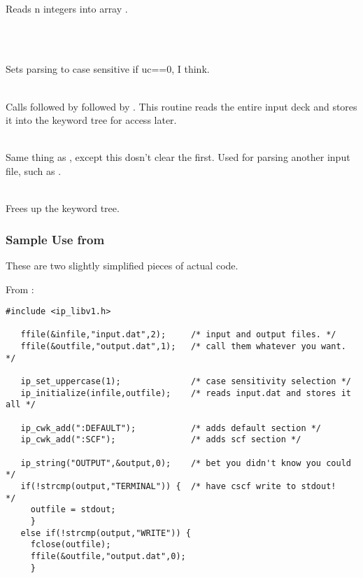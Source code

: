  \\
Reads n integers into array .

\begin{center}  \\ \end{center}

 \\
Sets parsing to case sensitive if uc==0, I think.

 \\
Calls  followed by  followed by 
.  This routine reads the entire input deck
and stores it into the keyword tree for access later.

 \\
Same thing as , except this dosn't clear the 
first.  Used for parsing another input file, such as .

 \\
Frees up the keyword tree.

\subsubsection{Sample Use from \PSIcscf}
These are two slightly simplified pieces of actual code.

From :
\begin{verbatim}
#include <ip_libv1.h>

   ffile(&infile,"input.dat",2);     /* input and output files. */
   ffile(&outfile,"output.dat",1);   /* call them whatever you want. */

   ip_set_uppercase(1);              /* case sensitivity selection */
   ip_initialize(infile,outfile);    /* reads input.dat and stores it all */

   ip_cwk_add(":DEFAULT");           /* adds default section */
   ip_cwk_add(":SCF");               /* adds scf section */

   ip_string("OUTPUT",&output,0);    /* bet you didn't know you could */
   if(!strcmp(output,"TERMINAL")) {  /* have cscf write to stdout!    */
     outfile = stdout;
     }
   else if(!strcmp(output,"WRITE")) {
     fclose(outfile);
     ffile(&outfile,"output.dat",0);
     }
\end{verbatim}

